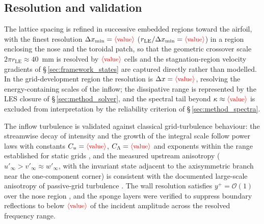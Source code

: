 \documentclass[lineno]{JFM-FLM_Au}
\newcommand{\tbd}[1]{\textcolor{red}{\ensuremath{\langle\mbox{\small #1}\rangle}}}
\begin{document}
\subsection{Resolution and validation}
\label{sec:method_resolution}

The lattice spacing is refined in successive embedded regions toward the
airfoil, with the finest resolution
$\Delta x_{\min} = \tbd{value}$ ($r_{\mathrm{LE}}/\Delta x_{\min}
= \tbd{value}$) in a region enclosing the nose and the toroidal patch,
so that the geometric crossover scale $2\pi r_{\mathrm{LE}} \approx
40$~mm is resolved by $\tbd{value}$ cells and the stagnation-region
velocity gradients of \S\,\ref{sec:framework_states} are captured
directly rather than modelled. In the grid-development region the
resolution is $\Delta x = \tbd{value}$, resolving the energy-containing
scales of the inflow; the dissipative range is represented by the LES
closure of \S\,\ref{sec:method_solver}, and the spectral tail beyond
$\kappa \approx \tbd{value}$ is excluded from interpretation by the
reliability criterion of \S\,\ref{sec:method_spectra}.

The inflow turbulence is validated against classical grid-turbulence
behaviour: the streamwise decay of intensity and the growth of the
integral scale follow power laws with constants
$C_u = \tbd{value}$, $C_\Lambda = \tbd{value}$ and exponents within the
range established for static grids
\citep{ComteBellotCorrsin1971,Roach1987,Ertunc2010}, and the measured
upstream anisotropy ($u'_\infty > v'_\infty \approx w'_\infty$, with the
invariant state adjacent to the axisymmetric branch near the
one-component corner) is consistent with the documented large-scale
anisotropy of passive-grid turbulence \citep{ComteBellotCorrsin1971,
Ertunc2010}. The wall resolution satisfies $y^+ = \mathcal{O}(1)$ over
the nose region
, and the sponge layers were verified to suppress boundary reflections to
below $\tbd{value}$ of the incident amplitude across the resolved
frequency range.



\end{document}
